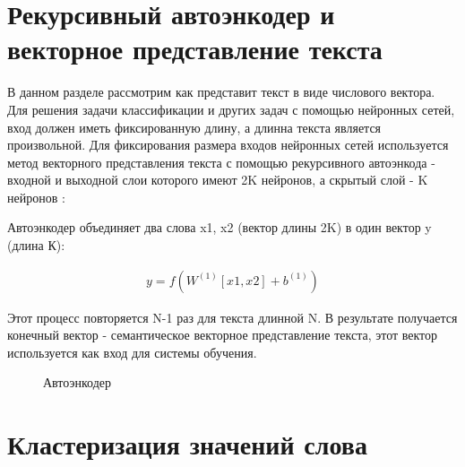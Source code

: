 \documentclass[12pt]{article}
\begin{document}
\section{Рекурсивный автоэнкодер и векторное представление текста}

В данном разделе рассмотрим как представит текст в виде числового вектора. Для решения задачи классификации и других задач с помощью нейронных сетей, вход должен иметь фиксированную длину, а длинна текста является произвольной. Для фиксирования размера входов нейронных сетей используется метод векторного представления текста с помощью рекурсивного автоэнкода - входной и выходной слои которого имеют 2K нейронов, а скрытый слой - K нейронов \cite{Socher2}: 

Автоэнкодер объединяет два слова x1, x2 (вектор длины 2K) в один вектор y (длина К):

  \begin{align}
	y=f{(W^{(1)}[x1, x2] + b^{(1)})}
  \end{align}

Этот процесс повторяется N-1 раз для текста длинной N. В результате получается конечный вектор - семантическое векторное представление текста, этот вектор используется как вход для системы обучения.

  \begin{figure}[H]
    \noindent{}
    \caption{Автоэнкодер}
    \label{figCurves}
  \end{figure}

\section{Кластеризация значений слова}
\end{document}
